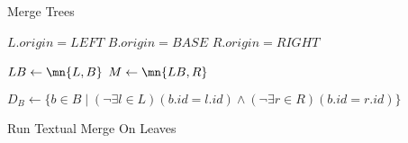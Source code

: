 \documentclass[../Algorithms.tex]{subfiles}
\begin{document}
    \begin{algorithm}[H]
        \caption{Merge Trees}


        \BlankLine

        $L.origin = LEFT$\;
        $B.origin = BASE$\;
        $R.origin = RIGHT$\;

        \BlankLine
        $LB \leftarrow \mn{L, B}$\;
        $M \leftarrow \mn{LB, R}$\;

        \BlankLine
        $D_B \leftarrow \{b \in B \mid (\lnot \exists l \in L)(b.id = l.id) \land (\lnot \exists r \in R)(b.id = r.id)\}$\;

        \BlankLine
        \;

        \BlankLine
        \;
    \end{algorithm}

    \begin{algorithm}[H]
        \caption{Run Textual Merge On Leaves}


        \BlankLine

        \BlankLine
    \end{algorithm}
\end{document}
